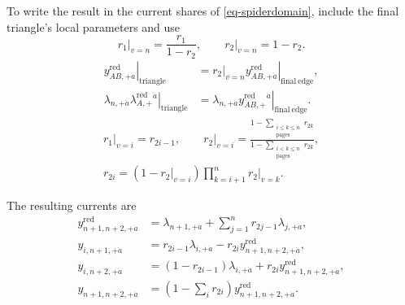\documentclass[11pt]{article}
\numberwithin{equation}{section}
\numberwithin{figure}{section}
\numberwithin{table}{section}
\begin{document}
To write the result in the current shares of \eqref{eq-spiderdomain}, include the final triangle's local parameters and use
\begin{equation*}
\left.r_1\right|_{v=n}=\frac{r_1}{1-r_2},\qquad
    \left.r_2\right|_{v=n}=1-r_2.
\end{equation*}
\begin{equation*}
\begin{aligned}
    \left.y_{AB,+\dot a}^{\mathrm{red}}\right|_{\mathrm{triangle}}
    &=\left.r_2\right|_{v=n}
    \left.y_{AB,+\dot a}^{\mathrm{red}}\right|_{\mathrm{final\ edge}},\\
    \lambda_{n,+\dot a}
    \left.\lambda_{A,+}^{\mathrm{red}}{}^{\dot a}\right|_{\mathrm{triangle}}
    &=\lambda_{n,+\dot a}
    \left.y_{AB,+}^{\mathrm{red}}{}^{\dot a}\right|_{\mathrm{final\ edge}}.
    \end{aligned}
\end{equation*}
\begin{equation}\label{eq-book-current-derivative}
\begin{gathered}
\left.r_1\right|_{v=i}=r_{2i-1},\qquad
\left.r_2\right|_{v=i}
=\frac{1-\sum_{\substack{i\le k\le n\\\mathrm{pages}}}r_{2k}}
{1-\sum_{\substack{i<k\le n\\\mathrm{pages}}}r_{2k}},\\[3pt]
r_{2i}=\left(1-\left.r_2\right|_{v=i}\right)
\prod_{k=i+1}^{n}\left.r_2\right|_{v=k}.
\end{gathered}
\end{equation}

The resulting currents are
\begin{equation}\label{eq-B-book-reduced-current}
\begin{aligned}
y^{\mathrm{red}}_{n+1,n+2,+\dot a}
&=\lambda_{n+1,+\dot a}+\sum_{j=1}^n r_{2j-1}\lambda_{j,+\dot a},\\
y_{i,n+1,+\dot a}
&=r_{2i-1}\lambda_{i,+\dot a}
-r_{2i}y^{\mathrm{red}}_{n+1,n+2,+\dot a},\\
y_{i,n+2,+\dot a}
&=(1-r_{2i-1})\lambda_{i,+\dot a}
+r_{2i}y^{\mathrm{red}}_{n+1,n+2,+\dot a},\\
y_{n+1,n+2,+\dot a}
&=\left(1-\sum_i r_{2i}\right)y^{\mathrm{red}}_{n+1,n+2,+\dot a}.
\end{aligned}
\end{equation}
\end{document}

